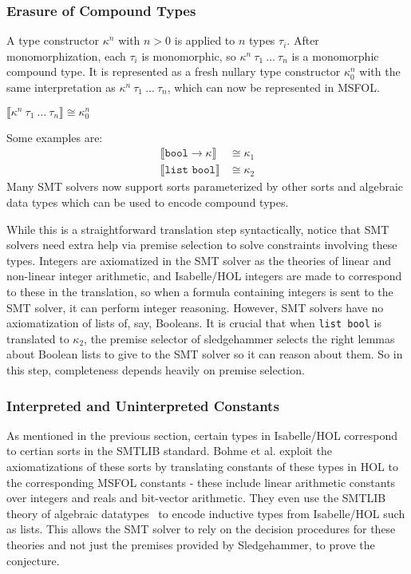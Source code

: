 \documentclass{article}
\begin{document}
	\subsubsection{Erasure of Compound Types}
		A type constructor $\kappa^n$ with 
		$n > 0$ is applied to $n$ types 
		$\tau_i$. After monomorphization, 
		each $\tau_i$ is monomorphic, so 
		$\kappa^n\ \tau_1\ ...\ \tau_n$ 
		is a monomorphic compound type. It
		is represented as a fresh nullary 
		type constructor $\kappa_0^n$ with 
		the same interpretation as 
		$\kappa^n\ \tau_1\ ...\ \tau_n$, 
		which can now be represented in 
		MSFOL.
		\begin{center}
			$\llbracket \kappa^n\ 
			\tau_1\ ...\ \tau_n \rrbracket
			\cong \kappa_0^n$
		\end{center}
		Some examples are:
		\begin{align*}
			\llbracket \texttt{bool} \to
			\kappa \rrbracket &\cong \kappa_1\\
			\llbracket \texttt{list\ bool}
			\rrbracket &\cong \kappa_2
		\end{align*}
		Many SMT solvers now support sorts 
		parameterized by other sorts and 
		algebraic data types which can be 
		used to encode compound types.
		
		While this is a straightforward
		translation step syntactically, 
		notice that SMT solvers need 
		extra help via premise selection 
		to solve constraints involving 
		these types. Integers are 
		axiomatized in the SMT solver as 
		the theories of linear and 
		non-linear integer arithmetic, and 
		Isabelle/HOL integers are made to 
		correspond to these in the translation, 
		so when a formula containing 
		integers is sent to the SMT solver, 
		it can perform integer reasoning. 
		However, SMT solvers have no 
		axiomatization of lists of, say, 
		Booleans. It is crucial that when 
		\texttt{list bool} is 
		translated to $\kappa_2$, the 
		premise selector of sledgehammer
		selects the right lemmas about 
		Boolean lists to give to the 
		SMT solver so it can reason 
		about them. So in this step, 
		completeness depends heavily on 
		premise selection.
		
	\subsubsection{Interpreted and Uninterpreted Constants}
		As mentioned in the previous section,
		certain types in Isabelle/HOL correspond
		to certian sorts in the SMTLIB standard.
		Bohme et al. exploit the axiomatizations 
		of these sorts by translating constants 
		of these types in HOL to the corresponding 
		MSFOL constants - these include linear
		arithmetic constants over integers and 
		reals and bit-vector arithmetic. They 
		even use the SMTLIB theory of algebraic 
		datatypes~\cite{BarST-PDPAR-06} to 
		encode inductive types from Isabelle/HOL
		such as lists. This allows the SMT solver
		to rely on the decision procedures for 
		these theories and not just the premises
		provided by Sledgehammer, to prove the 
		conjecture. 
		
\end{document}
